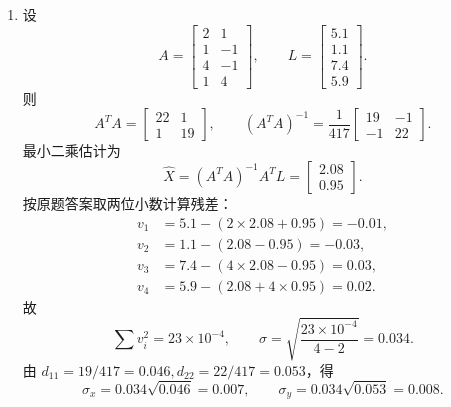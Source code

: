 \documentclass[UTF8,12pt,a4paper]{ctexart}
\begin{document}
\begin{enumerate}[label=\arabic*、]
\item 设
\begin{equation*}
A=\begin{bmatrix}2&1\\1&-1\\4&-1\\1&4\end{bmatrix},
\qquad
L=\begin{bmatrix}5.1\\1.1\\7.4\\5.9\end{bmatrix}.
\end{equation*}
则
\begin{equation*}
A^TA=\begin{bmatrix}22&1\\1&19\end{bmatrix},
\qquad
(A^TA)^{-1}=\frac{1}{417}\begin{bmatrix}19&-1\\-1&22\end{bmatrix}.
\end{equation*}
最小二乘估计为
\begin{equation*}
    \hat{X}=(A^TA)^{-1}A^TL=\begin{bmatrix}2.08\\0.95\end{bmatrix}.
\end{equation*}
按原题答案取两位小数计算残差：
\begin{equation*}
\begin{aligned}
    v_1&=5.1-(2\times2.08+0.95)=-0.01,\\
    v_2&=1.1-(2.08-0.95)=-0.03,\\
    v_3&=7.4-(4\times2.08-0.95)=0.03,\\
    v_4&=5.9-(2.08+4\times0.95)=0.02.
\end{aligned}
\end{equation*}
故
\begin{equation*}
    \sum v_i^2=23\times10^{-4},
    \qquad
    \sigma=\sqrt{\frac{23\times10^{-4}}{4-2}}=0.034.
\end{equation*}
由 $d_{11}=19/417=0.046,d_{22}=22/417=0.053$，得
\begin{equation*}
    \sigma_x=0.034\sqrt{0.046}=0.007,
    \qquad
    \sigma_y=0.034\sqrt{0.053}=0.008.
\end{equation*}

\newpage


\end{enumerate}
\end{document}
